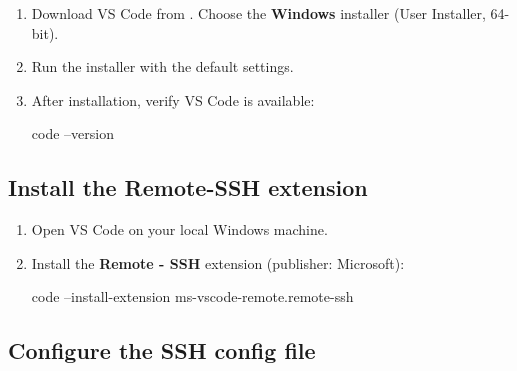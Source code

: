 \documentclass{guide}
\begin{document}
\stepbystep
\begin{enumerate}
  \item Download VS Code from
        .
        Choose the \textbf{Windows} installer (User Installer, 64-bit).

  \item Run the installer with the default settings.

  \item After installation, verify VS Code is available:

  \begin{code}[bash]
code --version
  \end{code}
\end{enumerate}

\subsection{Install the Remote-SSH extension}

\stepbystep
\begin{enumerate}
  \item Open VS Code on your local Windows machine.
  \item Install the \textbf{Remote - SSH} extension (publisher: Microsoft):

  \begin{code}[bash]
code --install-extension ms-vscode-remote.remote-ssh
  \end{code}
\end{enumerate}

\subsection{Configure the SSH config file}

\end{document}
